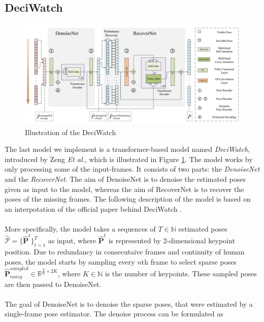 \documentclass[./main.tex]{subfiles}
\begin{document}
\subsection{DeciWatch}
\label{sec:deciwatch}
\begin{figure}[htbp]
    \centering
    \includegraphics[width=\textwidth]{./entities/deciwatch.PNG}
    \caption{Illustration of the DeciWatch \cite{https://doi.org/10.48550/arxiv.2203.08713}}
    \label{fig:deciwatch}
\end{figure}
\noindent The last model we implement is a transformer-based model named \textit{DeciWatch}, introduced by Zeng \textit{Et al.}, which is illustrated in Figure \ref{fig:deciwatch}. The model works by only processing some of the input-frames. It consists of two parts: the \textit{DenoiseNet} and the \textit{RecoverNet}. The aim of DenoiseNet is to denoise the estimated poses given as input to the model, whereas the aim of RecoverNet is to recover the poses of the missing frames. The following description of the model is based on an interpotation of the official paper behind DeciWatch \cite{https://doi.org/10.48550/arxiv.2203.08713}.
\\
\\
More specifically, the model takes a sequences of $T \in \mathbb{N}$ estimated poses $\hat{\mathcal{P}} = \{\hat{\bm{P}}^t\}_{t = 1} ^T$ as input, where $\hat{\bm{P}}^t$ is represented by 2-dimensional keypoint position. Due to redundancy in consecutaive frames and continuity of human poses, the model starts by sampling every $n$th frame to select sparse poses $\hat{\bm{P}}^{sampled} _{noisy} \in \mathbb{R}^{\frac{T}{n} \times 2K}$, where $K \in \mathbb{N}$ is the number of keypoints. These sampled poses are then passed to DenoiseNet.
\\
\\
The goal of DenoiseNet is to denoise the sparse poses, that were estimated by a single-frame pose estimator. The denoise process can be formulated as
\end{document}
